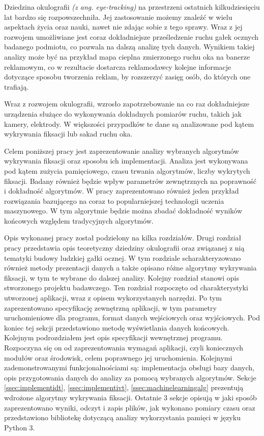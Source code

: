 \label{chapter:ch1}
Dziedzina okulografii \textit{(z ang. eye-tracking)} na przestrzeni ostatnich kilkudziesięciu lat bardzo się rozpowszechniła. Jej zastosowanie możemy znaleźć w wielu aspektach życia oraz nauki, nawet nie zdając sobie z tego sprawy. Wraz z jej rozwojem umożliwiane jest coraz dokładniejsze prześledzenie ruchu gałek ocznych badanego podmiotu, co pozwala na dalszą analizę tych danych. Wynikiem takiej analizy może być na przykład mapa cieplna zmierzonego ruchu oka na banerze reklamowym, co w rezultacie dostarcza reklamodawcy kolejne informacje dotyczące sposobu tworzenia reklam, by rozszerzyć zasięg osób, do których one trafiają.\par
Wraz z rozwojem okulografii, wzrosło zapotrzebowanie na co raz dokładniejsze urządzenia służące do wykonywania dokładnych pomiarów ruchu, takich jak kamery, elektrody. W większości przypadków te dane są analizowane pod kątem wykrywania fiksacji lub sakad ruchu oka.\par
Celem poniższej pracy jest zaprezentowanie analizy wybranych algorytmów wykrywania fiksacji oraz sposobu ich implementacji. Analiza jest wykonywana pod kątem zużycia pamięciowego, czasu trwania algorytmów, liczby wykrytych fiksacji. Badany również będzie wpływ parametrów zewnętrznych na poprawność i dokładność algorytmów. W pracy zaprezentowano również jeden przykład rozwiązania bazującego na coraz to popularniejszej technologii uczenia maszynowego. W tym algorytmie będzie można zbadać dokładność wyników końcowych względem tradycyjnych algorytmów.\par
Opis wykonanej pracy został podzielony na kilka rozdziałów. Drugi rozdział pracy przedstawia opis teoretyczny dziedziny okulografii oraz związanej z nią tematyki budowy ludzkiej gałki ocznej. W tym rozdziale scharakteryzowano również metody prezentacji danych a także opisano różne algorytmy wykrywania fiksacji, w tym te wybrane do dalszej analizy. Kolejny rozdział stanowi opis stworzonego projektu badawczego. Ten rozdział rozpoczęto od charakterystyki utworzonej aplikacji, wraz z opisem wykorzystanych narzędzi. Po tym zaprezentowano specyfikację zewnętrzną aplikacji, w tym parametry uruchomieniowe dla programu, format danych wejściowych oraz wyjściowych. Pod koniec tej sekcji przedstawiono metodę wyświetlania danych końcowych. Kolejnym podrozdziałem jest opis specyfikacji wewnętrznej programu. Rozpoczyna się on od zaprezentowania wymagań aplikacji, czyli koniecznych modułów oraz środowisk, celem poprawnego jej uruchomienia. Kolejnymi zademonstrowanymi funkcjonalnościami są: implementacja obsługi bazy danych, opis przygotowania danych do analizy za pomocą wybranych algorytmów. Sekcje \ref{ssec:implementidt}, \ref{ssec:implementivt}, \ref{ssec:machinelearningalg} prezentują wdrożone algorytmy wykrywania fiksacji. Ostatnie 3 sekcje opisują w jaki sposób zaprezentowano wyniki, odczyt i zapis plików, jak wykonano pomiary czasu oraz przedstawiono bibliotekę dotyczącą analizy wykorzystania pamięci w języku Python 3.\\
